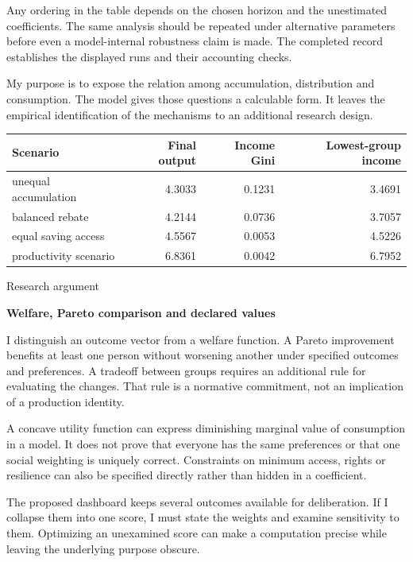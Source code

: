 \documentclass[10pt]{article}
\begin{document}
Any ordering in the table depends on the chosen horizon and the unestimated coefficients. The same analysis should be repeated under alternative parameters before even a model-internal robustness claim is made. The completed record establishes the displayed runs and their accounting checks.\par
My purpose is to expose the relation among accumulation, distribution and consumption. The model gives those questions a calculable form. It leaves the empirical identification of the mechanisms to an additional research design.\par
{\small\begin{tabularx}{\linewidth}{Xrrr}\toprule
Scenario & Final output & Income Gini & Lowest-group income\\\midrule
unequal accumulation & 4.3033 & 0.1231 & 3.4691\\
balanced rebate & 4.2144 & 0.0736 & 3.7057\\
equal saving access & 4.5567 & 0.0053 & 4.5226\\
productivity scenario & 6.8361 & 0.0042 & 6.7952\\
\bottomrule\end{tabularx}}\par
\clearpage
{\small\color{accent}Research argument}\par
{\LARGE\bfseries\color{ink}Welfare, Pareto comparison and declared values}\par\vspace{7pt}
I distinguish an outcome vector from a welfare function. A Pareto improvement benefits at least one person without worsening another under specified outcomes and preferences. A tradeoff between groups requires an additional rule for evaluating the changes. That rule is a normative commitment, not an implication of a production identity.\par
A concave utility function can express diminishing marginal value of consumption in a model. It does not prove that everyone has the same preferences or that one social weighting is uniquely correct. Constraints on minimum access, rights or resilience can also be specified directly rather than hidden in a coefficient.\par
The proposed dashboard keeps several outcomes available for deliberation. If I collapse them into one score, I must state the weights and examine sensitivity to them. Optimizing an unexamined score can make a computation precise while leaving the underlying purpose obscure.\par
\end{document}
